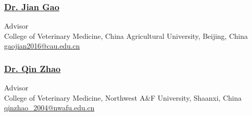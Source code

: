 \subsubsection*{\href{https://cvm.cau.edu.cn/art/2017/9/12/art_41957_71.html}{Dr. Jian Gao}}
Advisor\\
College of Veterinary Medicine, China Agricultural University, Beijing, China\\
\href{mailto:gaojian2016@cau.edu.cn}{gaojian2016@cau.edu.cn}\\


\subsubsection*{\href{https://dyxy.nwsuaf.edu.cn/en/People/FullProfessor/5e6012bf013a499c946289472b285795.htm}{Dr. Qin Zhao}}
Advisor\\
College of Veterinary Medicine, Northwest A\&F University, Shaanxi, China\\
\href{mailto:qinzhao\_2004@nwafu.edu.cn}{qinzhao\_2004@nwafu.edu.cn}\\
